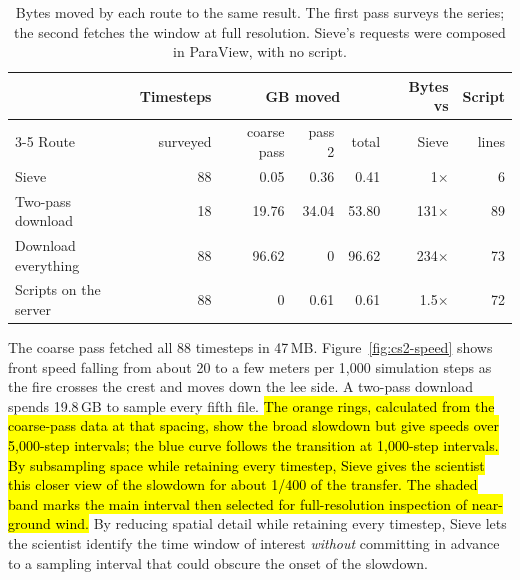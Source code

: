 \documentclass{vgtc}
\newcommand{\sname}{Sieve}
\newcommand{\Sname}{Sieve}
\begin{document}
\begin{table}[!h]
\centering\small
\begin{tabular*}{\textwidth}{@{\extracolsep{\fill}}lrrrrrr@{}}
\toprule
 & Timesteps & \multicolumn{3}{c}{GB moved} & Bytes vs & Script \\
\cmidrule(lr){3-5}
Route & surveyed & coarse pass & pass 2 & total & \Sname{} & lines \\
\midrule
\Sname{} & 88 & 0.05 & 0.36 & 0.41 & 1$\times$ & 6 \\
Two-pass download & 18 & 19.76 & 34.04 & 53.80 & 131$\times$ & 89 \\
Download everything & 88 & 96.62 & 0 & 96.62 & 234$\times$ & 73 \\
Scripts on the server & 88 & 0 & 0.61 & 0.61 & 1.5$\times$ & 72 \\
\bottomrule
\end{tabular*}
\caption{Bytes moved by each route to the same result. The first pass
surveys the series; the second fetches the window at full resolution.
\Sname{}'s requests were composed in ParaView, with no script.}
\label{tab:cs2}
\end{table}


The coarse pass fetched all 88 timesteps in 47\,MB. Figure~\ref{fig:cs2-speed} shows front speed falling from about 20 to a few meters per 1,000 simulation steps as the fire crosses the crest and moves down the lee side. A two-pass download spends 19.8\,GB to sample every fifth file. \hl{The orange rings, calculated from the coarse-pass data at that spacing, show the broad slowdown but give speeds over 5,000-step intervals; the blue curve follows the transition at 1,000-step intervals. By subsampling space while retaining every timestep, \sname{} gives the scientist this closer view of the slowdown for about 1/400 of the transfer. The shaded band marks the main interval then selected for full-resolution inspection of near-ground wind.} By reducing spatial detail while retaining every timestep, \sname{} lets the scientist identify the time window of interest \textit{without} committing in advance to a sampling interval that could obscure the onset of the slowdown.
\end{document}
